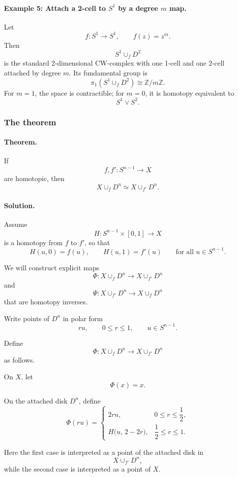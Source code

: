 \documentclass[12pt,a4paper]{article}
\theoremstyle{notespace}
\begin{document}
\paragraph{Example 5: Attach a 2-cell to \(S^1\) by a degree \(m\) map.}
Let
\[
f:S^1\to S^1,
\qquad
f(z)=z^m.
\]
Then
\[
S^1\cup_f D^2
\]
is the standard 2-dimensional CW-complex with one 1-cell and one 2-cell attached by degree \(m\). Its fundamental group is
\[
\pi_1(S^1\cup_f D^2)\cong \mathbb{Z}/m\mathbb{Z}.
\]
For \(m=1\), the space is contractible; for \(m=0\), it is homotopy equivalent to
\[
S^1\vee S^2.
\]

\subsubsection{The theorem}

\paragraph{Theorem.}
If
\[
f,f':S^{n-1}\to X
\]
are homotopic, then
\[
X\cup_f D^n \simeq X\cup_{f'} D^n.
\]

\paragraph{\textbf{Solution.}}
Assume
\[
H:S^{n-1}\times[0,1]\to X
\]
is a homotopy from \(f\) to \(f'\), so that
\[
H(u,0)=f(u),
\qquad
H(u,1)=f'(u)
\qquad
\text{for all }u\in S^{n-1}.
\]

We will construct explicit maps
\[
\Phi:X\cup_f D^n \to X\cup_{f'} D^n
\]
and
\[
\Psi:X\cup_{f'} D^n \to X\cup_f D^n
\]
that are homotopy inverses.

\medskip

Write points of \(D^n\) in polar form
\[
ru,
\qquad
0\le r\le 1,
\qquad
u\in S^{n-1}.
\]

Define
\[
\Phi:X\cup_f D^n \to X\cup_{f'} D^n
\]
as follows.

On \(X\), let
\[
\Phi(x)=x.
\]

On the attached disk \(D^n\), define
\[
\Phi(ru)=
\begin{cases}
	2ru, & 0\le r\le \dfrac12,\\[1.2ex]
	H\bigl(u,\,2-2r\bigr), & \dfrac12\le r\le 1.
\end{cases}
\]

Here the first case is interpreted as a point of the attached disk in
\[
X\cup_{f'} D^n,
\]
while the second case is interpreted as a point of \(X\).
\end{document}
